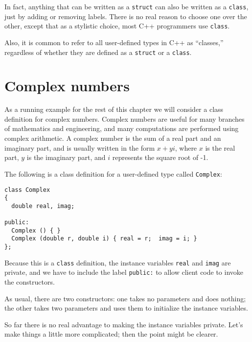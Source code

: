 
In fact, anything that can be written as a {\tt struct} can also
be written as a {\tt class}, just by adding or removing labels.
There is no real reason to choose one over the other, except that
as a stylistic choice, most C++ programmers use {\tt class}.

Also, it is common to refer to all user-defined types in C++ as
``classes,'' regardless of whether they are defined as a {\tt struct}
or a {\tt class}.

\section{Complex numbers}

As a running example for the rest of this chapter we will consider a
class definition for complex numbers.  Complex numbers are useful for
many branches of mathematics and engineering, and many computations
are performed using complex arithmetic.  A complex number is the sum
of a real part and an imaginary part, and is usually written in the
form $x + yi$, where $x$ is the real part, $y$ is the imaginary part,
and $i$ represents the square root of -1.

The following is a class definition for a user-defined type called
{\tt Complex}:

\begin{verbatim}
class Complex
{
  double real, imag;

public:
  Complex () { }
  Complex (double r, double i) { real = r;  imag = i; }
};
\end{verbatim}
%
Because this is a {\tt class} definition, the instance variables
{\tt real} and {\tt imag} are private, and we have to include
the label {\tt public:} to allow client code to invoke the
constructors.

As usual, there are two constructors: one takes no parameters and does
nothing; the other takes two parameters and uses them to initialize
the instance variables.


So far there is no real advantage to making the instance
variables private.  Let's make things a little more complicated;
then the point might be clearer.


